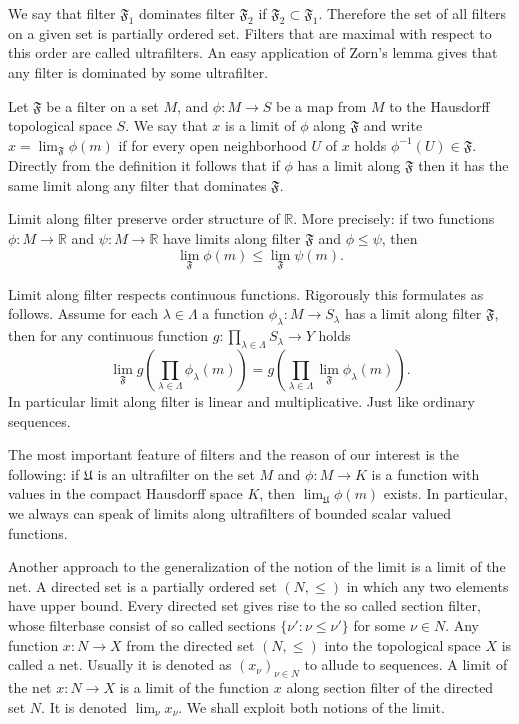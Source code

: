 We say that filter $\mathfrak{F}_1$ dominates filter $\mathfrak{F}_2$ if
$\mathfrak{F}_2\subset\mathfrak{F}_1$. Therefore the set of all filters on a
given set is partially ordered set. Filters that are maximal with respect to
this order are called ultrafilters. An easy application of Zorn's lemma gives
that any filter is dominated by some ultrafilter.

Let $\mathfrak{F}$ be a filter on  a set $M$, and $\phi:M\to S$ be a map from
$M$ to the Hausdorff topological space $S$. We say that $x$ is a limit of $\phi$
along $\mathfrak{F}$ and write $x=\lim_{\mathfrak{F}} \phi(m)$ if for every open
neighborhood $U$ of $x$ holds $\phi^{-1}(U)\in\mathfrak{F}$. Directly from the
definition it follows that if $\phi$ has a limit along $\mathfrak{F}$ then it
has the same limit along any filter that dominates $\mathfrak{F}$. 

Limit along filter preserve order structure of $\mathbb{R}$. More precisely: if
two functions $\phi:M\to\mathbb{R}$ and $\psi:M\to\mathbb{R}$ have limits along
filter $\mathfrak{F}$ and $\phi\leq\psi$, then 
$$
\lim_{\mathfrak{F}}\phi(m)\leq\lim_{\mathfrak{F}}\psi(m).
$$

Limit along filter respects continuous functions. Rigorously this formulates as
follows. Assume for each $\lambda\in\Lambda$ a function $\phi_\lambda:M\to
S_\lambda$ has a limit along filter $\mathfrak{F}$, then for any continuous
function $g:\prod_{\lambda\in\Lambda}S_\lambda\to Y$ holds
$$
\lim_{\mathfrak{F}}g\left(
  \prod_{\lambda\in\Lambda}\phi_\lambda(m)
\right)
=g\left(\prod_{\lambda\in\Lambda}\lim_{\mathfrak{F}}\phi_\lambda(m)\right).
$$
In particular limit along filter is linear and multiplicative. Just like
ordinary sequences.

The most important feature of filters and the reason of our interest is the
following: if $\mathfrak{U}$ is an ultrafilter on the set $M$ and $\phi:M\to K$
is a function with values in the compact Hausdorff space $K$, then
$\lim_{\mathfrak{U}}\phi(m)$ exists. In particular, we always can speak of
limits along ultrafilters of bounded scalar valued functions.

Another approach to the generalization of the notion of the limit is a limit of
the net. A directed set is a partially ordered set $(N,\leq)$ in which any two
elements have upper bound. Every directed set gives rise to the so called
section filter, whose filterbase consist of so called sections $
\{\nu':\nu\leq\nu' \}$ for some $\nu\in N$. Any function $x:N\to X$ from the
directed set $(N,\leq)$ into the topological space $X$ is called a net. Usually
it is denoted as ${(x_\nu)}_{\nu\in N}$ to allude to sequences. 
A limit of the net $x:N\to X$ is a limit of the function $x$ along section
filter of the directed set $N$. It is denoted $\lim_\nu x_\nu$. We shall exploit
both notions of the limit.

